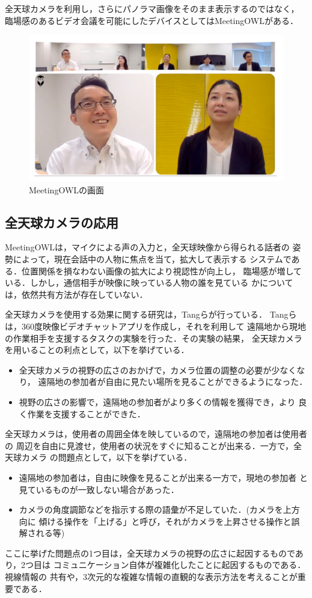 全天球カメラを利用し，さらにパノラマ画像をそのまま表示するのではなく，
臨場感のあるビデオ会議を可能にしたデバイスとしてはMeetingOWL\cite{21}がある．

\begin{figure}[tp]
  \centering
  \includegraphics[scale=0.7]{fig/OWL.png}
  \caption{MeetingOWLの画面\cite{21}}
\end{figure}

\subsection*{全天球カメラの応用}

MeetingOWLは，マイクによる声の入力と，全天球映像から得られる話者の
姿勢によって，現在会話中の人物に焦点を当て，拡大して表示する
システムである．位置関係を損なわない画像の拡大により視認性が向上し，
臨場感が増している．しかし，通信相手が映像に映っている人物の誰を見ている
かについては，依然共有方法が存在していない．

全天球カメラを使用する効果に関する研究は，Tangら\cite{19}が行っている．
Tangらは，360度映像ビデオチャットアプリを作成し，それを利用して
遠隔地から現地の作業相手を支援するタスクの実験を行った．その実験の結果，
全天球カメラを用いることの利点として，以下を挙げている．

\begin{itemize}
  \item 全天球カメラの視野の広さのおかげで，カメラ位置の調整の必要が少なくなり，
  遠隔地の参加者が自由に見たい場所を見ることができるようになった．
  \item 視野の広さの影響で，遠隔地の参加者がより多くの情報を獲得でき，より
  良く作業を支援することができた．
\end{itemize}

全天球カメラは，使用者の周囲全体を映しているので，遠隔地の参加者は使用者の
周辺を自由に見渡せ，使用者の状況をすぐに知ることが出来る．一方で，全天球カメラ
の問題点として，以下を挙げている．

\begin{itemize}
  \item 遠隔地の参加者は，自由に映像を見ることが出来る一方で，現地の参加者
  と見ているものが一致しない場合があった．
  \item カメラの角度調節などを指示する際の語彙が不足していた．(カメラを上方向に
  傾ける操作を「上げる」と呼び，それがカメラを上昇させる操作と誤解される等)
\end{itemize}

ここに挙げた問題点の1つ目は，全天球カメラの視野の広さに起因するものであり，2つ目は
コミュニケーション自体が複雑化したことに起因するものである．視線情報の
共有や，3次元的な複雑な情報の直観的な表示方法を考えることが重要である．